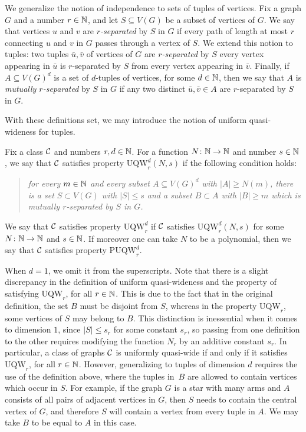 We generalize the notion of independence to sets of tuples of vertices.
Fix a graph $G$ and a number $r\in \N$, and let $S\subseteq V(G)$ be a subset of vertices of $G$.
We say that vertices $u$ and $v$ are {\em{$r$-separated}} by $S$ in $G$ if every path of length at most $r$ connecting $u$ and $v$ in $G$ passes through a vertex of $S$.
We extend this notion to tuples:
two tuples $\bar u,\bar v$ of vertices of $G$ are \emph{$r$-separated} by $S$ every vertex appearing in $\bar u$ is $r$-separated by $S$ from every vertex appearing in $\bar{v}$.
Finally, if $A\subseteq V(G)^d$ is a set of $d$-tuples of vertices, for some $d\in\N$,
then we say that $A$ is \emph{mutually $r$-separated} by $S$ in $G$ 
if any two distinct $\bar u,\bar v\in A$ are $r$-separated by $S$ in $G$.

\newcommand{\uqw}{\mathrm{UQW}}
\newcommand{\puqw}{\mathrm{PUQW}}
With these definitions set, we may introduce the notion of uniform quasi-wideness for tuples.

\begin{definition}
Fix a class $\cal C$ and numbers $r,d\in\N$.
For a function $N\from\N\to\N$
and number $s\in\N$,
we say that $\cal C$ satisfies property
$\uqw^d_r(N,s)$ if the following condition holds:
   \begin{quote}\itshape 
      for every $m\in \N$ and every subset 
     $A\subseteq V(G)^d$ with $|A|\ge N(m)$, there is a set $S\subset V(G)$ with $|S|\le s$ and a subset $B\subset A$ with $|B|\ge m$ which is mutually $r$-separated by $S$ in $G$.
   \end{quote}   
    We say that $\cal C$ satisfies property $\uqw^d_r$ if  $\cal C$ satisfies $\uqw^d_r(N,s)$ for 
	some $N\from\N\to\N$ and $s\in\N$.
	If moreover one can take $N$ to be a polynomial,
	then we say that $\cal C$ satisfies property $\puqw^d_r$.
\end{definition}

When $d=1$, we omit it from the superscripts.
  Note that there is a slight discrepancy 
  in the definition of uniform quasi-wideness 
  and the property of satisfying $\uqw_r$, for all $r\in \N$.
  This is due to the fact that in the original definition,
  the set $B$ must be disjoint from $S$,
  whereas in the property $\uqw_r$, 
  some vertices of $S$ may belong to $B$. This distinction is inessential when it comes to dimension $1$, since $|S|\le s_r$ for some constant $s_r$,
  so passing from one definition to the other requires 
  modifying the function $N_r$ by an additive constant $s_r$.
In particular, a class of graphs $\cal C$ is uniformly quasi-wide if and only if it 
	satisfies $\uqw_r$, for all $r\in \N$.  
  However, generalizing to tuples of dimension $d$ requires the use of the definition above, where the tuples in~$B$ are allowed to contain  vertices which occur in $S$. 
  For example, if the graph $G$ is a star with many arms and $A$ consists of all pairs of adjacent vertices in $G$, then $S$
  needs to contain the central vertex of $G$,
  and therefore $S$ will contain a vertex from every tuple in $A$. We may take $B$ to be equal to $A$ in this case.
  
